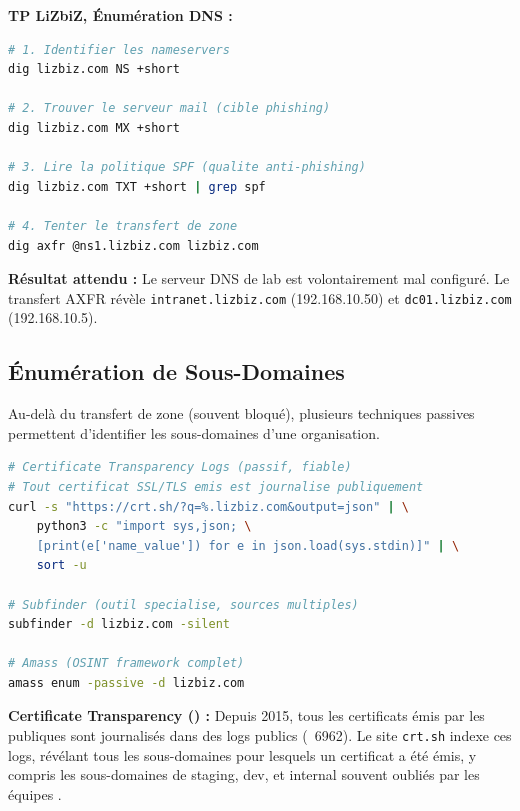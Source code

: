 \begin{boxlizbiz}
\textbf{TP LiZbiZ, Énumération DNS :}
\begin{lstlisting}[language=bash]
# 1. Identifier les nameservers
dig lizbiz.com NS +short

# 2. Trouver le serveur mail (cible phishing)
dig lizbiz.com MX +short

# 3. Lire la politique SPF (qualite anti-phishing)
dig lizbiz.com TXT +short | grep spf

# 4. Tenter le transfert de zone
dig axfr @ns1.lizbiz.com lizbiz.com
\end{lstlisting}
\textbf{Résultat attendu :} Le serveur DNS de lab est volontairement mal
configuré. Le transfert AXFR révèle \texttt{intranet.lizbiz.com} (192.168.10.50)
et \texttt{dc01.lizbiz.com} (192.168.10.5).
\end{boxlizbiz}

\subsection{Énumération de Sous-Domaines}
\label{subsec:subdomain_enum}

Au-delà du transfert de zone (souvent bloqué), plusieurs techniques passives
permettent d'identifier les sous-domaines d'une organisation.

\begin{lstlisting}[language=bash, caption={Énumération passive de sous-domaines}]
# Certificate Transparency Logs (passif, fiable)
# Tout certificat SSL/TLS emis est journalise publiquement
curl -s "https://crt.sh/?q=%.lizbiz.com&output=json" | \
    python3 -c "import sys,json; \
    [print(e['name_value']) for e in json.load(sys.stdin)]" | \
    sort -u

# Subfinder (outil specialise, sources multiples)
subfinder -d lizbiz.com -silent

# Amass (OSINT framework complet)
amass enum -passive -d lizbiz.com
\end{lstlisting}

\begin{boxinfo}
\textbf{Certificate Transparency () :} Depuis 2015, tous les
certificats  émis par les  publiques sont journalisés
dans des logs publics (\sigle{RFC}~6962). Le site \texttt{crt.sh} indexe
ces logs, révélant tous les sous-domaines pour lesquels un certificat a
été émis, y compris les sous-domaines de staging, dev, et internal souvent
oubliés par les équipes \sigle{IT}.
\end{boxinfo}

